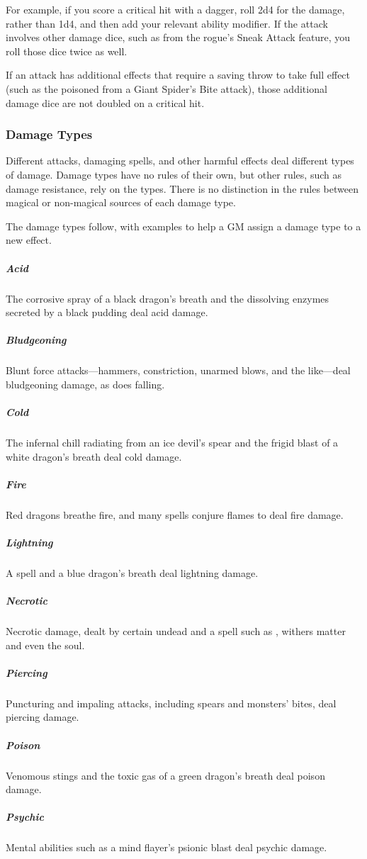 For example, if you score a critical hit with a dagger, roll 2d4 for the damage, rather than 1d4, and then add your relevant ability modifier. If the attack involves other damage dice, such as from the rogue's Sneak Attack feature, you roll those dice twice as well.

If an attack has additional effects that require a saving throw to take full effect (such as the poisoned from a Giant Spider's Bite attack), those additional damage dice are not doubled on a critical hit.

\subsubsection{Damage Types}

Different attacks, damaging spells, and other harmful effects deal different types of damage. Damage types have no rules of their own, but other rules, such as damage resistance, rely on the types. There is no distinction in the rules between magical or non-magical sources of each damage type.

The damage types follow, with examples to help a GM assign a damage type to a new effect.

\subparagraph*{Acid} The corrosive spray of a black dragon's breath and the dissolving enzymes secreted by a black pudding deal acid damage.

\subparagraph*{Bludgeoning} Blunt force attacks---hammers, constriction, unarmed blows, and the like---deal bludgeoning damage, as does falling.

\subparagraph*{Cold} The infernal chill radiating from an ice devil's spear and the frigid blast of a white dragon's breath deal cold damage.

\subparagraph*{Fire} Red dragons breathe fire, and many spells conjure flames to deal fire damage.

\subparagraph*{Lightning} A  spell and a blue dragon's breath deal lightning damage.

\subparagraph*{Necrotic} Necrotic damage, dealt by certain undead and a spell such as , withers matter and even the soul.

\subparagraph*{Piercing} Puncturing and impaling attacks, including spears and monsters' bites, deal piercing damage.

\subparagraph*{Poison} Venomous stings and the toxic gas of a green dragon's breath deal poison damage.

\subparagraph*{Psychic} Mental abilities such as a mind flayer's psionic blast deal psychic damage.

